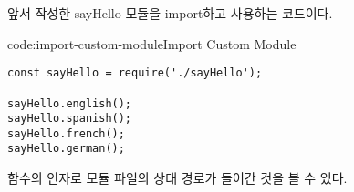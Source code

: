  앞서 작성한 sayHello 모듈을 import하고 사용하는 코드이다.

\begin{codeenv}{code:import-custom-module}{Import Custom Module}\begin{verbatim}
const sayHello = require('./sayHello');

sayHello.english();
sayHello.spanish();
sayHello.french();
sayHello.german();
\end{verbatim}
\end{codeenv}

 함수의 인자로  모듈 파일의 상대 경로가 들어간 것을 볼 수 있다.
